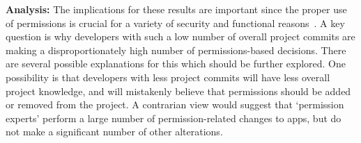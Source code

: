 \documentclass{sig-alternate-05-2015}
\newcommand{\todo}[1]{\textcolor{cyan}{\textbf{[#1]}}}
\newcommand{\dan}[1]{\textcolor{blue}{{\it [Dan says: #1]}}}
\begin{document}






\vspace{5mm}
\noindent
\textbf{Analysis:}
The implications for these results are important since the proper use of permissions is crucial for a variety of security and functional reasons~\cite{Felt:2011:APD:2046707.2046779, 5482589, Egelman12choicearchitecture}. A key question is why developers with such a low number of overall project commits are making a disproportionately high number of permissions-based decisions. There are several possible explanations for this which should be further explored. One possibility is that developers with less project commits will have less overall project knowledge, and will mistakenly believe that permissions should be added or removed from the project. A contrarian view would suggest that `permission experts' perform a large number of permission-related changes to apps, but do not make a significant number of other alterations.  %









\end{document}
